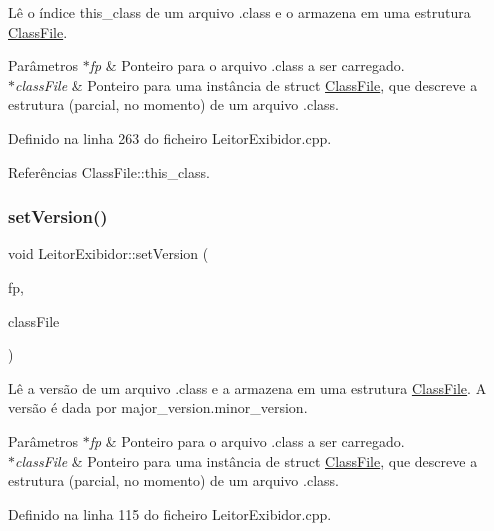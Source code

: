 Lê o índice this\+\_\+class de um arquivo .class e o armazena em uma estrutura \hyperlink{classClassFile}{Class\+File}. 
\begin{DoxyParams}{Parâmetros}
{\em $\ast$fp} & Ponteiro para o arquivo .class a ser carregado. \\
\hline
{\em $\ast$class\+File} & Ponteiro para uma instância de struct \hyperlink{classClassFile}{Class\+File}, que descreve a estrutura (parcial, no momento) de um arquivo .class. \\
\hline
\end{DoxyParams}


Definido na linha 263 do ficheiro Leitor\+Exibidor.\+cpp.



Referências Class\+File\+::this\+\_\+class.

\mbox{\label{classLeitorExibidor_a9a11956018816200897ca137c027cbf1}} 
\subsubsection{\texorpdfstring{set\+Version()}{setVersion()}}
{\footnotesize\ttfamily void Leitor\+Exibidor\+::set\+Version (\begin{DoxyParamCaption}\item[{F\+I\+LE $\ast$}]{fp,  }\item[{\hyperlink{classClassFile}{Class\+File} $\ast$}]{class\+File }\end{DoxyParamCaption})\hspace{0.3cm}{\ttfamily [private]}}

Lê a versão de um arquivo .class e a armazena em uma estrutura \hyperlink{classClassFile}{Class\+File}. A versão é dada por major\+\_\+version.\+minor\+\_\+version. 
\begin{DoxyParams}{Parâmetros}
{\em $\ast$fp} & Ponteiro para o arquivo .class a ser carregado. \\
\hline
{\em $\ast$class\+File} & Ponteiro para uma instância de struct \hyperlink{classClassFile}{Class\+File}, que descreve a estrutura (parcial, no momento) de um arquivo .class. \\
\hline
\end{DoxyParams}


Definido na linha 115 do ficheiro Leitor\+Exibidor.\+cpp.



